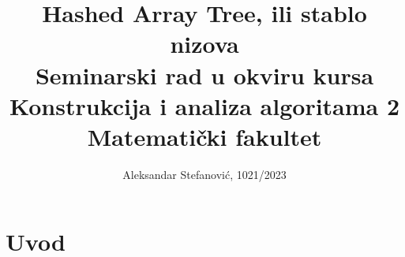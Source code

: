 \documentclass[a4paper]{article}
\title{Hashed Array Tree, ili stablo nizova\\ \small{Seminarski rad u okviru kursa\\Konstrukcija i analiza algoritama 2\\ Matematički fakultet}}
\author{Aleksandar Stefanović, 1021/2023}
\begin{document}
\maketitle

\begin{abstract}

\end{abstract}

\tableofcontents

\newpage

\section{Uvod}
\end{document}
